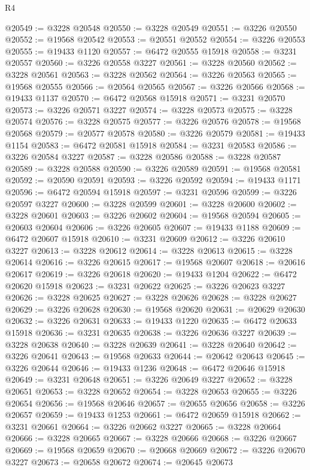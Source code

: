 \begin{lexlean}{R4}
\begin{coremodule}
@20549 := @3228 @20548
@20550 := @3228 @20549
@20551 := @3226 @20550
@20552 := @19568 @20542
@20553 := @20551 @20552
@20554 := @3226 @20553
@20555 := @19433 @1120
@20557 := @6472 @20555 @15918
@20558 := @3231 @20557
@20560 := @3226 @20558 @3227
@20561 := @3228 @20560
@20562 := @3228 @20561
@20563 := @3228 @20562
@20564 := @3226 @20563
@20565 := @19568 @20555
@20566 := @20564 @20565
@20567 := @3226 @20566
@20568 := @19433 @1137
@20570 := @6472 @20568 @15918
@20571 := @3231 @20570
@20573 := @3226 @20571 @3227
@20574 := @3228 @20573
@20575 := @3228 @20574
@20576 := @3228 @20575
@20577 := @3226 @20576
@20578 := @19568 @20568
@20579 := @20577 @20578
@20580 := @3226 @20579
@20581 := @19433 @1154
@20583 := @6472 @20581 @15918
@20584 := @3231 @20583
@20586 := @3226 @20584 @3227
@20587 := @3228 @20586
@20588 := @3228 @20587
@20589 := @3228 @20588
@20590 := @3226 @20589
@20591 := @19568 @20581
@20592 := @20590 @20591
@20593 := @3226 @20592
@20594 := @19433 @1171
@20596 := @6472 @20594 @15918
@20597 := @3231 @20596
@20599 := @3226 @20597 @3227
@20600 := @3228 @20599
@20601 := @3228 @20600
@20602 := @3228 @20601
@20603 := @3226 @20602
@20604 := @19568 @20594
@20605 := @20603 @20604
@20606 := @3226 @20605
@20607 := @19433 @1188
@20609 := @6472 @20607 @15918
@20610 := @3231 @20609
@20612 := @3226 @20610 @3227
@20613 := @3228 @20612
@20614 := @3228 @20613
@20615 := @3228 @20614
@20616 := @3226 @20615
@20617 := @19568 @20607
@20618 := @20616 @20617
@20619 := @3226 @20618
@20620 := @19433 @1204
@20622 := @6472 @20620 @15918
@20623 := @3231 @20622
@20625 := @3226 @20623 @3227
@20626 := @3228 @20625
@20627 := @3228 @20626
@20628 := @3228 @20627
@20629 := @3226 @20628
@20630 := @19568 @20620
@20631 := @20629 @20630
@20632 := @3226 @20631
@20633 := @19433 @1220
@20635 := @6472 @20633 @15918
@20636 := @3231 @20635
@20638 := @3226 @20636 @3227
@20639 := @3228 @20638
@20640 := @3228 @20639
@20641 := @3228 @20640
@20642 := @3226 @20641
@20643 := @19568 @20633
@20644 := @20642 @20643
@20645 := @3226 @20644
@20646 := @19433 @1236
@20648 := @6472 @20646 @15918
@20649 := @3231 @20648
@20651 := @3226 @20649 @3227
@20652 := @3228 @20651
@20653 := @3228 @20652
@20654 := @3228 @20653
@20655 := @3226 @20654
@20656 := @19568 @20646
@20657 := @20655 @20656
@20658 := @3226 @20657
@20659 := @19433 @1253
@20661 := @6472 @20659 @15918
@20662 := @3231 @20661
@20664 := @3226 @20662 @3227
@20665 := @3228 @20664
@20666 := @3228 @20665
@20667 := @3228 @20666
@20668 := @3226 @20667
@20669 := @19568 @20659
@20670 := @20668 @20669
@20672 := @3226 @20670 @3227
@20673 := @20658 @20672
@20674 := @20645 @20673

\end{coremodule}
\end{lexlean}

